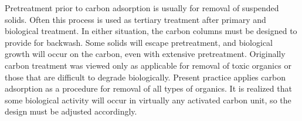 Pretreatment prior to carbon adsorption is usually for removal of suspended solids. Often this process is used as tertiary treatment after primary and biological treatment. In either situation, the carbon columns must be designed to provide for backwash. Some solids will escape pretreatment, and biological growth will occur on the carbon, even with extensive pretreatment. Originally carbon treatment was viewed only as applicable for removal of toxic organics or those that are difficult to degrade biologically. Present practice applies carbon adsorption as a procedure for removal of all types of organics. It is realized that some biological activity will occur in virtually any activated carbon unit, so the design must be adjusted accordingly.